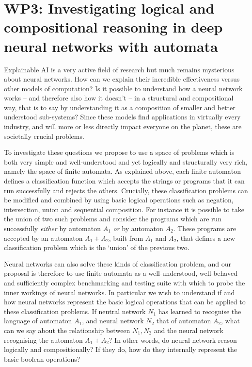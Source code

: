\documentclass[11pt,a4paper]{article}
\begin{document}
	\section*{WP3: Investigating logical and compositional reasoning in deep neural networks with automata}
		Explainable AI is a very active field of research but much remains mysterious about neural networks. How can we explain their incredible effectiveness versus other models of computation? Is it possible to understand how a neural network works -- and therefore also how it doesn't -- in a structural and compositional way, that is to say by understanding it as a composition of smaller and better understood sub-systems? Since these models find applications in virtually every industry, and will more or less directly impact everyone on the planet, these are societally crucial problems. 
		
		To investigate these questions we propose to use a space of problems which is both very simple and well-understood and yet logically and structurally very rich, namely the space of finite automata. As explained above, each finite automaton defines a classification function which accepts the strings or programs that it can run successfully and rejects the others. Crucially, these classification problems can be modified and combined by using basic logical operations such as negation, intersection, union and sequential composition. For instance it is possible to take the union of two such problems and consider the programs which are run successfully \emph{either} by automaton $A_1$ \emph{or} by automaton $A_2$. These programs are accepted by an automaton $A_1+A_2$, built from $A_1$ and $A_2$, that defines a new classification problem which is the `union' of the previous two. 
		
		Neural networks can also solve these kinds of classification problem, and our proposal is therefore to use finite automata as a well-understood, well-behaved and sufficiently complex benchmarking and testing suite with which to probe the inner workings of neural networks. In particular we wish to understand if and how neural networks represent the basic logical operations that can be applied to these classification problems. If neutral network $N_1$ has learned to recognise the language of automaton $A_1$, and neural network $N_2$ that of automaton $A_2$, what can we say about the relationship between $N_1,N_2$ and the neural network recognising the automaton $A_1+ A_2$? In other words, do neural network reason logically and compositionally? If they do, how do they internally represent the basic boolean operations?
		
\end{document}
